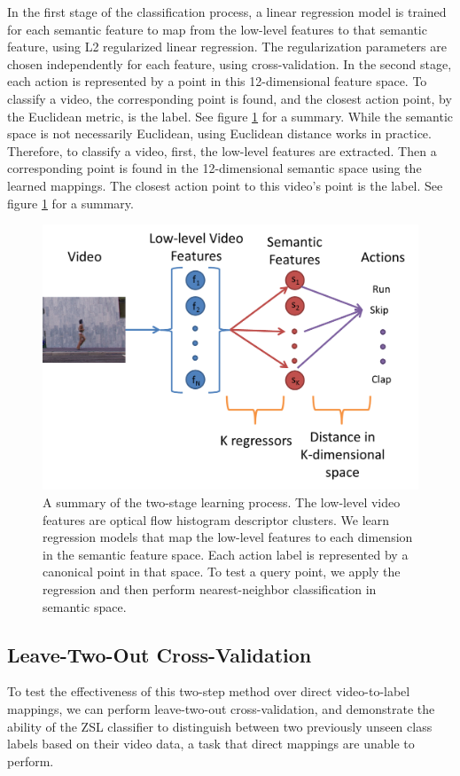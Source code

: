 \documentclass{article}
\begin{document}
In the first stage of the classification process, a linear regression model is trained for each semantic feature to map from the low-level features to that semantic feature, using L2 regularized linear regression. The regularization parameters are chosen independently for each feature, using cross-validation. In the second stage, each action is represented by a point in this 12-dimensional feature space. To classify a video, the corresponding point is found, and the closest action point, by the Euclidean metric, is the label. See figure \ref{2stage} for a summary. While the semantic space is not necessarily Euclidean, using Euclidean distance works in practice.
Therefore, to classify a video, first, the low-level features are extracted. Then a corresponding point is found in the 12-dimensional semantic space using the learned mappings. The closest action point to this video's point is the label. See figure \ref{2stage} for a summary.

\begin{figure}[h]
  \centering
  \includegraphics[width=.45\linewidth]{2stagelearning.png}
  \caption{A summary of the two-stage learning process. The low-level video features are optical flow histogram descriptor clusters. We learn regression models that map the low-level features to each dimension in the semantic feature space. Each action label is represented by a canonical point in that space.  To test a query point, we apply the regression and then perform nearest-neighbor classification in semantic space.}
  \label{2stage}
\end{figure}

\subsection{Leave-Two-Out Cross-Validation}
To test the effectiveness of this two-step method over direct video-to-label mappings, we can perform leave-two-out cross-validation, and demonstrate the ability of the ZSL classifier to distinguish between two previously unseen class labels based on their video data, a task that direct mappings are unable to perform.
\end{document}
